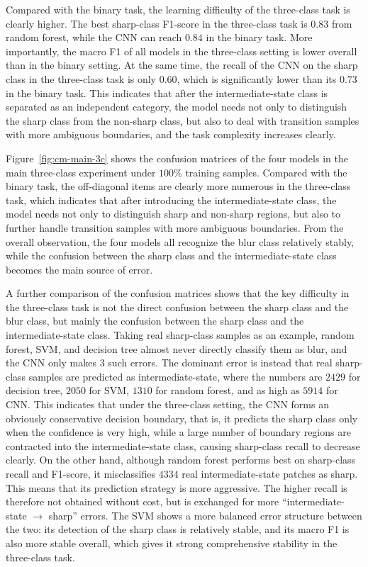 \par Compared with the binary task, the learning difficulty of the three-class
task is clearly higher. The best sharp-class F1-score in the three-class task
is $0.83$ from random forest, while the CNN can reach $0.84$ in the binary
task. More importantly, the macro F1 of all models in the three-class setting
is lower overall than in the binary setting. At the same time, the recall of
the CNN on the sharp class in the three-class task is only $0.60$, which is
significantly lower than its $0.73$ in the binary task. This indicates that
after the intermediate-state class is separated as an independent category,
the model needs not only to distinguish the sharp class from the non-sharp
class, but also to deal with transition samples with more ambiguous
boundaries, and the task complexity increases clearly.

\par Figure~\ref{fig:cm-main-3c} shows the confusion matrices of the four models
in the main three-class experiment under $100\%$ training samples. Compared
with the binary task, the off-diagonal items are clearly more numerous in the
three-class task, which indicates that after introducing the intermediate-state
class, the model needs not only to distinguish sharp and non-sharp regions, but
also to further handle transition samples with more ambiguous boundaries. From
the overall observation, the four models all recognize the blur class
relatively stably, while the confusion between the sharp class and the
intermediate-state class becomes the main source of error.

\par A further comparison of the confusion matrices shows that the key
difficulty in the three-class task is not the direct confusion between the
sharp class and the blur class, but mainly the confusion between the sharp
class and the intermediate-state class. Taking real sharp-class samples as an
example, random forest, SVM, and decision tree almost never directly classify
them as blur, and the CNN only makes $3$ such errors. The dominant error is
instead that real sharp-class samples are predicted as intermediate-state,
where the numbers are $2429$ for decision tree, $2050$ for SVM, $1310$ for
random forest, and as high as $5914$ for CNN. This indicates that under the
three-class setting, the CNN forms an obviously conservative decision
boundary, that is, it predicts the sharp class only when the confidence is
very high, while a large number of boundary regions are contracted into the
intermediate-state class, causing sharp-class recall to decrease clearly. On
the other hand, although random forest performs best on sharp-class recall and
F1-score, it misclassifies $4334$ real intermediate-state patches as sharp.
This means that its prediction strategy is more aggressive. The higher recall
is therefore not obtained without cost, but is exchanged for more
``intermediate-state $\rightarrow$ sharp'' errors. The SVM shows a more
balanced error structure between the two: its detection of the sharp class is
relatively stable, and its macro F1 is also more stable overall, which gives
it strong comprehensive stability in the three-class task.

